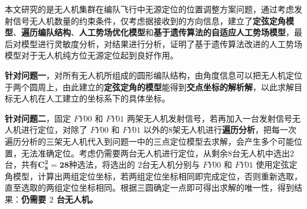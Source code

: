 \documentclass{my_paper}
\begin{document}
\newpage

\begin{center}
    \lunwenbiaoti

    \vspace{2ex}
    \zhaiyao
\end{center}

本文研究的是无人机集群在编队飞行中无源定位的位置调整方案问题，通过考虑发射信号无人机数量的约束条件，仅考虑据接收到的方向信息，建立了\textbf{定弦定角模型}、\textbf{遍历编队结构}、\textbf{人工势场优化模型}和\textbf{基于遗传算法的自适应人工势场模型}，最后对模型进行灵敏度分析，对结果进行分析，证明了基于遗传算法改进的人工势场模型对于无人机纯方位无源定位起到良好作用。

\textbf{针对问题一}，对所有无人机所组成的圆形编队结构，由角度信息可以把无人机定位于两个圆周上，由此建立的\textbf{定弦定角的模型}能得到\textbf{交点坐标的解析解}，以此求解目标无人机在人工建立的坐标系下的具体坐标。

\textbf{针对问题二}，固定 $FY00$ 和 $FY01$ 两架无人机发射信号，若再加入一台发射信号无人机进行定位，对除了 $FY00$ 和 $FY01$ 以外的$8$架无人机进行\textbf{遍历分析}，把每一次遍历分析的三架无人机代入到问题一中的三点定位模型去求解，会产生多个可能位置，无法准确定位。考虑仍需要两台无人机进行定位，从剩余$8$台无人机中选出$2$台，共有$\mathbf{C_8^{2}=28}$种选法，将选出的 $2$台无人机分别与 $FY00$ 和 $FY01$ 使用定弦定角模型，计算出两组定位坐标，若两组定位坐标相同即完成定位，否则重新选取，直至选取的两组定位坐标相同。根据三圆确定一点即可得出求解的唯一性，得到结果：\textbf{仍需要 $2$ 台无人机。}
\end{document}
